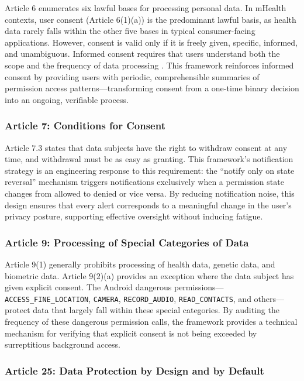 Article 6 enumerates six lawful bases for processing personal data. In mHealth contexts, user consent (Article 6(1)(a)) is the predominant lawful basis, as health data rarely falls within the other five bases in typical consumer-facing applications. However, consent is valid only if it is freely given, specific, informed, and unambiguous. Informed consent requires that users understand both the scope and the frequency of data processing \cite{14}. This framework reinforces informed consent by providing users with periodic, comprehensible summaries of permission access patterns—transforming consent from a one-time binary decision into an ongoing, verifiable process.

\subsubsection{Article 7: Conditions for Consent}

Article 7.3 states that data subjects have the right to withdraw consent at any time, and withdrawal must be as easy as granting. This framework's notification strategy is an engineering response to this requirement: the ``notify only on state reversal'' mechanism triggers notifications exclusively when a permission state changes from allowed to denied or vice versa. By reducing notification noise, this design ensures that every alert corresponds to a meaningful change in the user's privacy posture, supporting effective oversight without inducing fatigue.

\subsubsection{Article 9: Processing of Special Categories of Data}

Article 9(1) generally prohibits processing of health data, genetic data, and biometric data. Article 9(2)(a) provides an exception where the data subject has given explicit consent. The Android dangerous permissions—\texttt{ACCESS\_FINE\_LOCATION}, \texttt{CAMERA}, \texttt{RECORD\_AUDIO}, \texttt{READ\_CONTACTS}, and others—protect data that largely fall within these special categories. By auditing the frequency of these dangerous permission calls, the framework provides a technical mechanism for verifying that explicit consent is not being exceeded by surreptitious background access.

\subsubsection{Article 25: Data Protection by Design and by Default}

